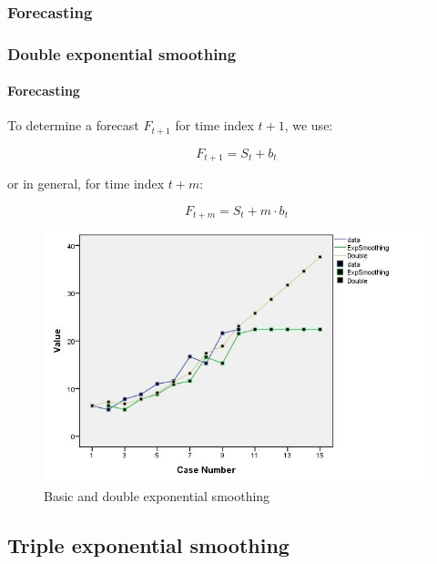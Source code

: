 \documentclass{beamer}
\begin{document}
\subsubsection{Forecasting}

\begin{frame}
  \frametitle{Double exponential smoothing}
  \framesubtitle{Forecasting}
  
  To determine a forecast $F_{t+1}$ for time index $t+1$, we use:

  \[ F_{t+1} = S_t + b_t \]

  or in general, for time index $t+m$:

  \[ F_{t+m} = S_t + m \cdot b_t \]
\end{frame}

\begin{frame}
  \begin{figure}
    \centering
    \includegraphics[width=\textwidth]{img/tijdreeks71}
    \caption{Basic and double exponential smoothing}
    \label{fig:tijdreeks71}
  \end{figure}
\end{frame}

\subsection{Triple exponential smoothing}
\end{document}
